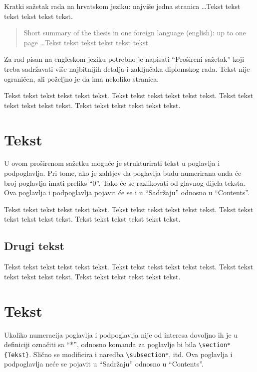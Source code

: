 \documentclass[a4paper,12pt]{report}
\begin{document}
\begin{sazetak}
  \noindent Kratki sa\v{z}etak rada na hrvatskom jeziku: najvi\v{s}e jedna stranica
  \ldots Tekst tekst tekst tekst tekst tekst.
\end{sazetak}

\begin{abstract}
  \noindent Short summary of the thesis in one foreign language (english): up
  to one page \ldots Tekst tekst tekst tekst tekst tekst.
\end{abstract}


\begin{prosirenisazetak}
Za rad pisan na engleskom jeziku potrebno je napisati ``Prošireni sažetak'' koji
treba sadržavati više najbitnijih detalja i zaključaka diplomskog rada. Tekst
nije ograničen, ali poželjno je da ima nekoliko stranica. 

Tekst tekst tekst tekst tekst tekst.
Tekst tekst tekst tekst tekst tekst.
Tekst tekst tekst tekst tekst tekst.
Tekst tekst tekst tekst tekst tekst.
 
\section{Tekst}
U ovom proširenom sažetku moguće je strukturirati tekst u poglavlja i
podpoglavlja. Pri tome, ako je zahtjev da poglavlja budu numerirana onda će
broj poglavlja imati prefiks ``0''. Tako će se razlikovati od glavnog dijela teksta. 
Ova poglavlja i podpoglavlja pojavit će se i u ``Sadržaju'' odnosno u
``Contents''.

Tekst tekst tekst tekst tekst tekst.
Tekst tekst tekst tekst tekst tekst.
Tekst tekst tekst tekst tekst tekst.
Tekst tekst tekst tekst tekst tekst.
 

\subsection{Drugi tekst}
Tekst tekst tekst tekst tekst tekst.
Tekst tekst tekst tekst tekst tekst.
Tekst tekst tekst tekst tekst tekst.
Tekst tekst tekst tekst tekst tekst.
 

\section*{Tekst}
Ukoliko numeracija poglavlja i podpoglavlja nije od interesa dovoljno ih je u
definiciji označiti sa ``*'', odnosno komanda za poglavlje bi bila
\verb|\section*{Tekst}|. Slično se modificira i naredba \verb|\subsection*|,
itd. Ova poglavlja i podpoglavlja neće se pojavit u ``Sadržaju'' odnosno u
``Contents''.


\end{prosirenisazetak}
\end{document}
